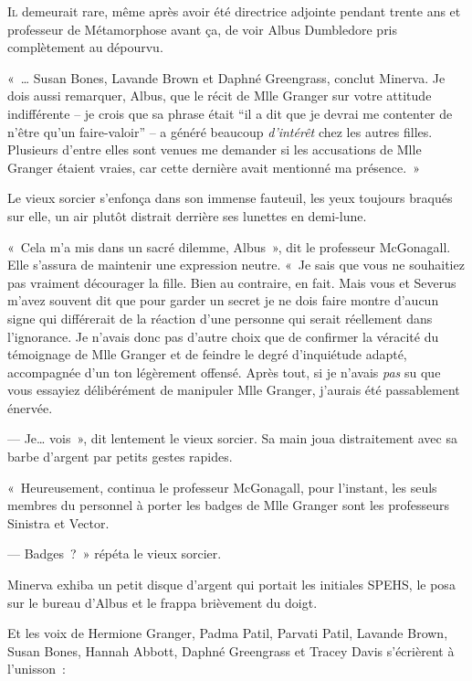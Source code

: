 
\lettrine{I}{l} demeurait rare, même après avoir été directrice adjointe pendant trente ans et professeur de Métamorphose avant ça, de voir Albus Dumbledore pris complètement au dépourvu.

«~… Susan Bones, Lavande Brown et Daphné Greengrass, conclut Minerva.
Je dois aussi remarquer, Albus, que le récit de Mlle Granger sur votre attitude indifférente -- je crois que sa phrase était “il a dit que je devrai me contenter de n'être qu'un faire-valoir” -- a généré beaucoup \emph{d'intérêt} chez les autres filles.
Plusieurs d'entre elles sont venues me demander si les accusations de Mlle Granger étaient vraies, car cette dernière avait mentionné ma présence.~»

Le vieux sorcier s'enfonça dans son immense fauteuil, les yeux toujours braqués sur elle, un air plutôt distrait derrière ses lunettes en demi-lune.

«~Cela m'a mis dans un sacré dilemme, Albus~», dit le professeur McGonagall.
Elle s'assura de maintenir une expression neutre.
«~Je sais que vous ne souhaitiez pas vraiment décourager la fille.
Bien au contraire, en fait.
Mais vous et Severus m'avez souvent dit que pour garder un secret je ne dois faire montre d'aucun signe qui différerait de la réaction d'une personne qui serait réellement dans l'ignorance.
Je n'avais donc pas d'autre choix que de confirmer la véracité du témoignage de Mlle Granger et de feindre le degré d'inquiétude adapté, accompagnée d'un ton légèrement offensé.
Après tout, si je n'avais \emph{pas} su que vous essayiez délibérément de manipuler Mlle Granger, j'aurais été passablement énervée.

--- Je… vois~», dit lentement le vieux sorcier.
Sa main joua distraitement avec sa barbe d'argent par petits gestes rapides.

«~Heureusement, continua le professeur McGonagall, pour l'instant, les seuls membres du personnel à porter les badges de Mlle Granger sont les professeurs Sinistra et Vector.

--- Badges~?~»
répéta le vieux sorcier.

Minerva exhiba un petit disque d'argent qui portait les initiales SPEHS, le posa sur le bureau d'Albus et le frappa brièvement du doigt.

Et les voix de Hermione Granger, Padma Patil, Parvati Patil, Lavande Brown, Susan Bones, Hannah Abbott, Daphné Greengrass et Tracey Davis s'écrièrent à l'unisson~:

